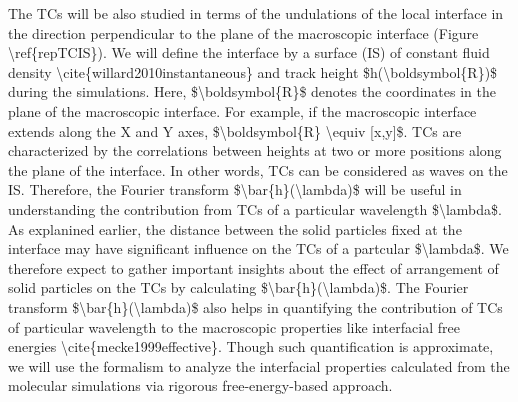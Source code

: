 \par The TCs will be also studied in terms of the undulations of the local interface in the direction perpendicular to the plane of the macroscopic interface (Figure \textbackslash ref\{repTCIS\}). We will define the interface by a surface (IS) of constant fluid density \textbackslash cite\{willard2010instantaneous\} and track height \$h(\textbackslash boldsymbol\{R\})\$ during the simulations. Here, \$\textbackslash boldsymbol\{R\}\$ denotes the coordinates in the plane of the macroscopic interface. For example, if the macroscopic interface extends along the X and Y axes, \$\textbackslash boldsymbol\{R\} \textbackslash equiv [x,y]\$. TCs are characterized by the correlations between heights at two or more positions along the plane of the interface. In other words, TCs can be considered as waves on the IS. Therefore, the Fourier transform \$\textbackslash bar\{h\}(\textbackslash lambda)\$ will be useful in understanding the contribution from TCs of a particular wavelength \$\textbackslash lambda\$. As explanined earlier, the distance between the solid particles fixed at the interface may have significant influence on the TCs of a partcular \$\textbackslash lambda\$. We therefore  expect to gather important insights about the effect of arrangement of solid particles on the TCs by calculating \$\textbackslash bar\{h\}(\textbackslash lambda)\$. The Fourier transform \$\textbackslash bar\{h\}(\textbackslash lambda)\$ also helps in quantifying the contribution of TCs of particular wavelength to the macroscopic properties like interfacial free energies \textbackslash cite\{mecke1999effective\}. Though such quantification is approximate, we will use the formalism to analyze the interfacial properties calculated from the molecular simulations via rigorous free-energy-based approach.
